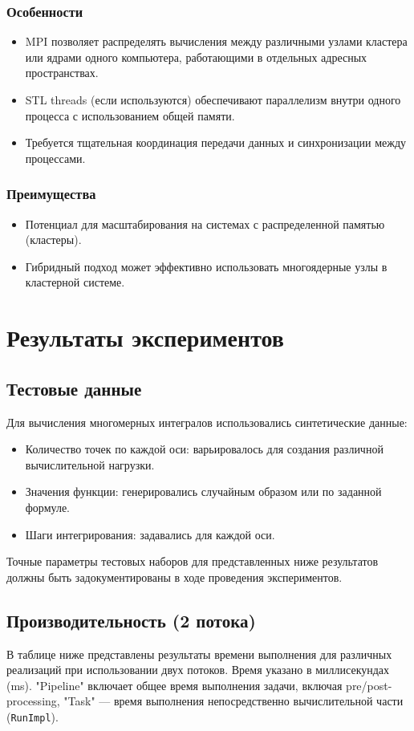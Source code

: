 \documentclass[12pt]{article}
\begin{document}
\subsubsection*{Особенности}
\begin{itemize}
  \item MPI позволяет распределять вычисления между различными узлами кластера или ядрами одного компьютера, работающими в отдельных адресных пространствах.
  \item STL threads (если используются) обеспечивают параллелизм внутри одного процесса с использованием общей памяти.
  \item Требуется тщательная координация передачи данных и синхронизации между процессами.
\end{itemize}

\subsubsection*{Преимущества}
\begin{itemize}
  \item Потенциал для масштабирования на системах с распределенной памятью (кластеры).
  \item Гибридный подход может эффективно использовать многоядерные узлы в кластерной системе.
\end{itemize}

\section{Результаты экспериментов}
\subsection*{Тестовые данные}
Для вычисления многомерных интегралов использовались синтетические данные:
\begin{itemize}
  \item Количество точек по каждой оси: варьировалось для создания различной вычислительной нагрузки.
  \item Значения функции: генерировались случайным образом или по заданной формуле.
  \item Шаги интегрирования: задавались для каждой оси.
\end{itemize}
Точные параметры тестовых наборов для представленных ниже результатов должны быть задокументированы в ходе проведения экспериментов.

\subsection*{Производительность (2 потока)}
В таблице ниже представлены результаты времени выполнения для различных реализаций при использовании двух потоков. Время указано в миллисекундах (ms). "Pipeline" включает общее время выполнения задачи, включая pre/post-processing, "Task" — время выполнения непосредственно вычислительной части (\texttt{RunImpl}).
\end{document}
